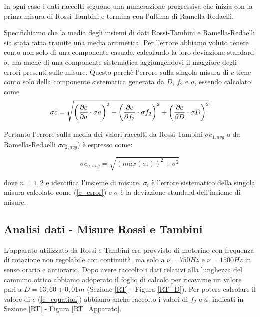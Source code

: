 \documentclass{article}
\begin{document}
In ogni caso i dati raccolti seguono una numerazione progressiva che inizia con la prima misura di Rossi-Tambini e termina con l'ultima di Ramella-Redaelli.

Specifichiamo che la media degli insiemi di dati Rossi-Tambini e Ramella-Redaelli sia stata fatta tramite una media aritmetica. Per l'errore
abbiamo voluto tenere conto non solo di una componente casuale, calcolando la loro deviazione standard $\sigma$, ma anche di una componente sistematica aggiungendovi
il maggiore degli errori presenti sulle misure.
Questo perchè l'errore sulla singola misura di $c$ tiene conto solo della componente sistematica generata da $D$, $f_2$ e $a$, essendo calcolato come
\begin{equation}
    \centering
    \sigma c = \sqrt{\bigg(\frac{\partial c}{\partial a}\cdot \sigma a\bigg)^2 + \bigg(\frac{\partial c}{\partial f_2}\cdot \sigma f_2 \bigg)^2 + \bigg(\frac{\partial c}{\partial D}\cdot \sigma D \bigg)^2} 
    \label{c_error}
\end{equation}

Pertanto l'errore sulla media dei valori raccolti da Rossi-Tambini $\sigma c_{1,avg}$ o da Ramella-Redaelli $\sigma c_{2,avg}$) è espresso come:

\begin{equation}
    \sigma c_{n,avg} =\sqrt{(max(\sigma_{i}))^2+\sigma^2}
    \label{c_Errore}
\end{equation}

dove $n=1,2$ e identifica l'insieme di misure, $\sigma_{i}$ è l'errore sistematico della singola misura calcolato come (\ref{c_error}) e $\sigma$ è la deviazione standard dell'insieme di misure.



\subsection{Analisi dati - Misure Rossi e Tambini} \label{DataAnalysis_RT}

L'apparato utilizzato da Rossi e Tambini era provvisto di motorino con frequenza di rotazione non regolabile con continuità, ma solo a $\nu=750Hz$ e $\nu=1500Hz$
in senso orario e antiorario. Dopo avere raccolto i dati relativi alla lunghezza del cammino ottico abbiamo adoperato il foglio di calcolo per ricavarne un valore pari 
a $D = 13,60 \pm 0,01 m$ (Sezione \ref{RT} - Figura \ref{RT_D}). Per potere calcolare il valore di $c$ (\ref{c_equation}) abbiamo anche raccolto i valori di $f_2$ e $a$,
indicati in Sezione \ref{RT} - Figura \ref{RT_Apparato}.
\end{document}
